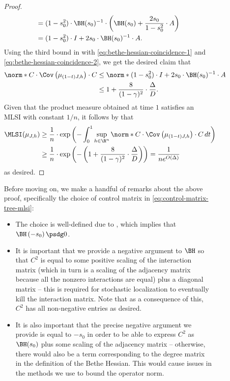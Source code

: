 \documentclass[11pt,letterpaper]{article}
\begin{document}
\begin{figure}
\begin{proof}
\begin{align*}
                &= (1-s_0^2) \cdot \BH(s_0)^{-1} \cdot \left( \BH(s_0) + \frac{2s_0}{1-s_0^2} \cdot A \right) \\
                &= (1-s_0^2) \cdot I + 2 s_0 \cdot \BH(s_0)^{-1} \cdot A.
        \end{align*}
        Using the third bound in  with \eqref{eq:bethe-hessian-coincidence-1} and \eqref{eq:bethe-hessian-coincidence-2}, we get the desired claim that
        \begin{align*}
            \norm*{C \cdot \Cov\left( \mu_{(1-t)J,h} \right) \cdot C} &\le \norm*{ (1-s_0^2) \cdot I + 2 s_0 \cdot \BH(s_0)^{-1} \cdot A } \\
                &\le 1 + \frac{8}{(1-\gamma)^2} \cdot \frac{\Delta}{D}.
        \end{align*}
        Given that the product measure obtained at time $1$ satisfies an MLSI with constant $1/n$, it follows by  that
        \begin{align*}
            \MLSI(\mu_{J,h}) &\ge \frac{1}{n} \cdot \exp\left( - \int_{0}^{1} \sup_{h \in \R^n} \norm*{ C \cdot \Cov\left( \mu_{(1-t)J, h} \right) \cdot C } \,dt \right) \\
                &\ge \frac{1}{n} \cdot \exp\left( - \left( 1 + \frac{8}{(1-\gamma)^2} \cdot \frac{\Delta}{D} \right) \right) = \frac{1}{ne^{O(\Delta)}}
        \end{align*}
        as desired.
    \end{proof}

    Before moving on, we make a handful of remarks about the above proof, specifically the choice of control matrix in \eqref{eq:control-matrix-tree-mlsi}:
    \begin{itemize}
        \item The choice is well-defined due to , which implies that $\BH\left(-s_0\right) \psdg 0$.
        \item It is important that we provide a negative argument to $\BH$ so that $C^2$ is equal to some positive scaling of the interaction matrix (which in turn is a scaling of the adjacency matrix because all the nonzero interactions are equal) plus a diagonal matrix -- this is required for stochastic localization to eventually kill the interaction matrix. Note that as a consequence of this, $C^2$ has all non-negative entries as desired.
        \item It is also important that the precise negative argument we provide is equal to $-s_0$ in order to be able to express $C^2$ as $\BH(s_0)$ plus some scaling of the adjacency matrix -- otherwise, there would also be a term corresponding to the degree matrix in the definition of the Bethe Hessian. This would cause issues in the methods we use to bound the operator norm. 
    \end{itemize}


\end{figure}
\end{document}
